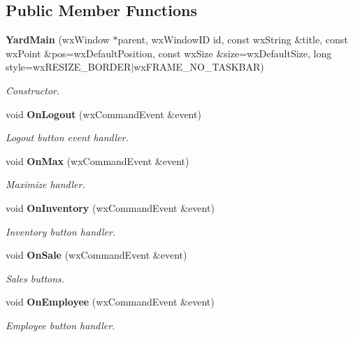 \subsection*{Public Member Functions}
\begin{CompactItemize}
\item 
{\bf Yard\-Main} (wx\-Window $\ast$parent, wx\-Window\-ID id, const wx\-String \&title, const wx\-Point \&pos=wx\-Default\-Position, const wx\-Size \&size=wx\-Default\-Size, long style=wx\-RESIZE\_\-BORDER$|$wx\-FRAME\_\-NO\_\-TASKBAR)
\begin{CompactList}\small\item\em Constructor. \item\end{CompactList}\item 
void {\bf On\-Logout} (wx\-Command\-Event \&event)\label{classYardMain_a2}

\begin{CompactList}\small\item\em Logout button event handler. \item\end{CompactList}\item 
void {\bf On\-Max} (wx\-Command\-Event \&event)\label{classYardMain_a3}

\begin{CompactList}\small\item\em Maximize handler. \item\end{CompactList}\item 
void {\bf On\-Inventory} (wx\-Command\-Event \&event)\label{classYardMain_a4}

\begin{CompactList}\small\item\em Inventory button handler. \item\end{CompactList}\item 
void {\bf On\-Sale} (wx\-Command\-Event \&event)\label{classYardMain_a5}

\begin{CompactList}\small\item\em Sales buttons. \item\end{CompactList}\item 
void {\bf On\-Employee} (wx\-Command\-Event \&event)\label{classYardMain_a6}

\begin{CompactList}\small\item\em Employee button handler. \item\end{CompactList}\end{CompactItemize}


